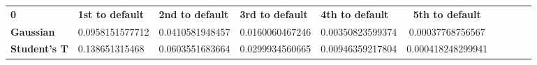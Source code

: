 \begin{center}
 \begin{tabular}{|l|l|l|l|l|c|c|c|c|c|}
\hline
\textbf{0} & \textbf{1st to default} & \textbf{2nd to default} & \textbf{3rd to default} & \textbf{4th to default} & \textbf{5th to default}\\\hhline{|=|=|=|=|=|=|}
\textbf{Gaussian} & 0.0958151577712 & 0.0410581948457 & 0.0160060467246 & 0.00350823599374 & 0.00037768756567\\
\textbf{Student's T} & 0.138651315468 & 0.0603551683664 & 0.0299934560665 & 0.00946359217804 & 0.000418248299941\\
\hline
\end{tabular}
\end{center}
